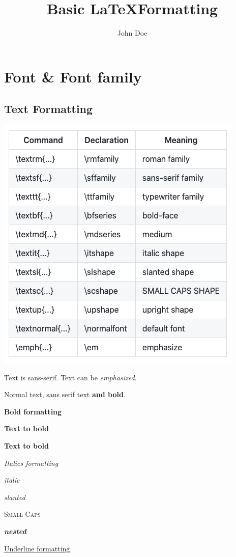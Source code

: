 \documentclass{article}
\title{Basic \LaTeX Formatting}
\author{John Doe}
\date{}
\begin{document}
\section{Font & Font family}


\subsection{Text Formatting}

\includegraphics[scale=0.5]{image/commands.png}

{\sffamily
	Text is sans-serif. Text can be {\em emphasized}.
}

Normal text, {\sffamily sans serif text {\bfseries and bold}}.

\textbf{Bold formatting}

{\bfseries Text to bold}

\bfseries Text to bold \mdseries

\emph{Italics formatting}

\textit{italic}

\textsl{slanted}

\textsc{Small Caps}

\textit{\textbf{nested}}

\underline{Underline formatting}
\end{document}
